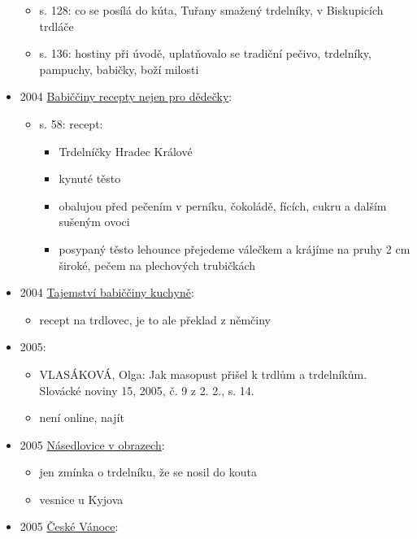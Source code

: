 \begin{itemize}
  \begin{itemize}
  \tightlist
  \item
    s. 128: co se posílá do kúta, Tuřany smažený trdelníky, v
    Biskupicích trdláče
  \item
    s. 136: hostiny při úvodě, uplatňovalo se tradiční pečivo,
    trdelníky, pampuchy, babičky, boží milosti
  \end{itemize}
\item
  2004
  \href{https://www.digitalniknihovna.cz/mzk/uuid/uuid:5823cdf0-1024-11ea-af21-005056827e52}{Babiččiny
  recepty nejen pro dědečky}:

  \begin{itemize}
  \tightlist
  \item
    s. 58: recept:

    \begin{itemize}
    \tightlist
    \item
      Trdelníčky Hradec Králové
    \item
      kynuté těsto
    \item
      obalujou před pečením v perníku, čokoládě, fících, cukru a dalším
      sušeným ovoci
    \item
      posypaný těsto lehounce přejedeme válečkem a krájíme na pruhy 2 cm
      široké, pečem na plechových trubičkách
    \end{itemize}
  \end{itemize}
\item
  2004
  \href{https://ceskadigitalniknihovna.cz/uuid/uuid:b5a5b2c0-dc5e-11e5-984e-005056827e52}{Tajemství
  babiččiny kuchyně}:

  \begin{itemize}
  \tightlist
  \item
    recept na trdlovec, je to ale překlad z němčiny
  \end{itemize}
\item
  2005:

  \begin{itemize}
  \tightlist
  \item
    VLASÁKOVÁ, Olga: Jak masopust přišel k trdlům a trdelníkům. Slovácké
    noviny 15, 2005, č. 9 z 2. 2., s. 14.
  \item
    není online, najít
  \end{itemize}
\item
  2005
  \href{https://ceskadigitalniknihovna.cz/uuid/uuid:024b8100-ced7-11e3-b110-005056827e51}{Násedlovice
  v obrazech}:

  \begin{itemize}
  \tightlist
  \item
    jen zmínka o trdelníku, že se nosil do kouta
  \item
    vesnice u Kyjova
  \end{itemize}
\item
  2005
  \href{https://ceskadigitalniknihovna.cz/uuid/uuid:12d02530-5e00-11e5-bf4b-005056827e51}{České
  Vánoce}:


\end{itemize}

